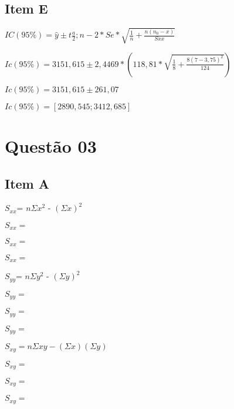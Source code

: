 \documentclass{article}
\begin{document}
    \subsection{Item E}

            \begin{flushleft}
            $IC(95\%) = \hat{y} \pm  t \frac{a}{2}; n-2 *Se * \sqrt{\frac{1}{n} + \frac{n(n_0 - x)}{Sxx}}$ 

            $Ic(95\%) = 3151,615 \pm 2,4469 *  (118,81* \sqrt{\frac{1}{8} + \frac{8(7-3,75)^2}{124}})$

            $Ic(95\%) =  3151,615 \pm 261,07$

            $Ic(95\%) = [2890,545 ; 3412,685]$

            \end{flushleft}





\section{Questão 03}    

    \subsection*{Item A}
        
        \begin{flushleft}

        $S_{xx}$= $n\Sigma x^2$ - $(\Sigma x)^2$ 

        $S_{xx} =$

        $S_{xx} =$

        $S_{xx}=$

        \end{flushleft}

        \begin{flushleft}
            $S_{yy}$= $n\Sigma y^2$ - $(\Sigma y)^2$

            $S_{yy} = $

            $S_{yy} = $

            $S_{yy} = $

        \end{flushleft}

\begin{flushleft}

$S_{xy} = n\Sigma xy-(\Sigma x)(\Sigma y)$

$S_{xy} = $

$S_{xy} =$ 

$S_{xy} =$ 

\end{flushleft}
\end{document}
